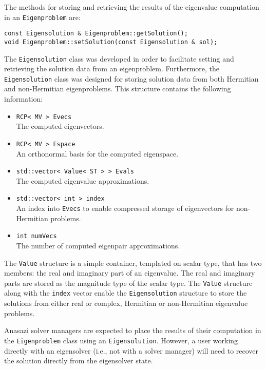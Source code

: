 \documentclass[acmtoms]{acmtrans2m}
\newcommand{\aspace}[1]{\texttt{#1}}
\begin{document}
The methods for storing and retrieving the results of the
eigenvalue computation in an \aspace{Eigenproblem} are:
\begin{verbatim}
const Eigensolution & Eigenproblem::getSolution();
void Eigenproblem::setSolution(const Eigensolution & sol);
\end{verbatim}

The \aspace{Eigensolution} class was developed in order to
facilitate setting and retrieving the solution data from an eigenproblem.  
Furthermore, the \aspace{Eigensolution} class was designed for storing
solution data from both Hermitian and non-Hermitian eigenproblems. 
This structure contains the following information:
\begin{itemize}
  \item \verb!RCP< MV > Evecs! \\
   The computed eigenvectors.
 \item \verb!RCP< MV > Espace! \\
   An orthonormal basis for the computed eigenspace.
 \item \verb!std::vector< Value< ST > > Evals! \\
   The computed eigenvalue approximations.
 \item \verb!std::vector< int > index! \\
   An index into \verb!Evecs! to enable compressed storage of eigenvectors for non-Hermitian problems.
 \item \verb!int numVecs! \\
   The number of computed eigenpair approximations.
\end{itemize}
The \aspace{Value} structure is a simple container, templated on scalar type, that
has two members: the real and imaginary part of an eigenvalue.  The real and imaginary
parts are stored as the magnitude type of the scalar type.  The \aspace{Value} structure
along with the \verb!index! vector enable the \aspace{Eigensolution} structure to 
store the solutions from either real or complex, Hermitian or non-Hermitian eigenvalue
problems.

Anasazi solver managers are expected to place the results of their computation in the
\aspace{Eigenproblem} class using an \aspace{Eigensolution}. However, a user working
directly with an eigensolver (i.e., not with a solver manager) will need to recover the
solution directly from the eigensolver state.

\end{document}
